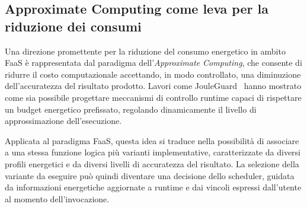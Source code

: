 \subsection{Approximate Computing come leva per la riduzione dei consumi}

Una direzione promettente per la riduzione del consumo energetico
in ambito FaaS è rappresentata dal paradigma dell'\emph{Approximate
Computing}, che consente di ridurre il costo computazionale
accettando, in modo controllato, una diminuzione dell'accuratezza
del risultato prodotto. Lavori come JouleGuard~\cite{jouleguard}
hanno mostrato come sia possibile progettare meccanismi di controllo
runtime capaci di rispettare un budget energetico prefissato,
regolando dinamicamente il livello di approssimazione dell'esecuzione.

Applicata al paradigma FaaS, questa idea si traduce nella possibilità
di associare a una stessa funzione logica più varianti implementative,
caratterizzate da diversi profili energetici e da diversi livelli
di accuratezza del risultato. La selezione della variante da eseguire
può quindi diventare una decisione dello scheduler, guidata da
informazioni energetiche aggiornate a runtime e dai vincoli
espressi dall'utente al momento dell'invocazione.
